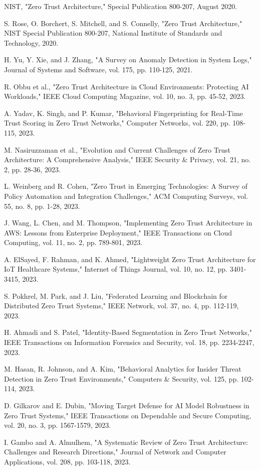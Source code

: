 \documentclass[conference]{IEEEtran}
\begin{document}
\begin{thebibliography}{20}
NIST, "Zero Trust Architecture," Special Publication 800-207, August 2020.

S. Rose, O. Borchert, S. Mitchell, and S. Connelly, "Zero Trust Architecture," NIST Special Publication 800-207, National Institute of Standards and Technology, 2020.

H. Yu, Y. Xie, and J. Zhang, "A Survey on Anomaly Detection in System Logs," Journal of Systems and Software, vol. 175, pp. 110-125, 2021.

R. Obbu et al., "Zero Trust Architecture in Cloud Environments: Protecting AI Workloads," IEEE Cloud Computing Magazine, vol. 10, no. 3, pp. 45-52, 2023.

A. Yadav, K. Singh, and P. Kumar, "Behavioral Fingerprinting for Real-Time Trust Scoring in Zero Trust Networks," Computer Networks, vol. 220, pp. 108-115, 2023.

M. Nasiruzzaman et al., "Evolution and Current Challenges of Zero Trust Architecture: A Comprehensive Analysis," IEEE Security \& Privacy, vol. 21, no. 2, pp. 28-36, 2023.

L. Weinberg and R. Cohen, "Zero Trust in Emerging Technologies: A Survey of Policy Automation and Integration Challenges," ACM Computing Surveys, vol. 55, no. 8, pp. 1-28, 2023.

J. Wang, L. Chen, and M. Thompson, "Implementing Zero Trust Architecture in AWS: Lessons from Enterprise Deployment," IEEE Transactions on Cloud Computing, vol. 11, no. 2, pp. 789-801, 2023.

A. ElSayed, F. Rahman, and K. Ahmed, "Lightweight Zero Trust Architecture for IoT Healthcare Systems," Internet of Things Journal, vol. 10, no. 12, pp. 3401-3415, 2023.

S. Pokhrel, M. Park, and J. Liu, "Federated Learning and Blockchain for Distributed Zero Trust Systems," IEEE Network, vol. 37, no. 4, pp. 112-119, 2023.

H. Ahmadi and S. Patel, "Identity-Based Segmentation in Zero Trust Networks," IEEE Transactions on Information Forensics and Security, vol. 18, pp. 2234-2247, 2023.

M. Hasan, R. Johnson, and A. Kim, "Behavioral Analytics for Insider Threat Detection in Zero Trust Environments," Computers \& Security, vol. 125, pp. 102-114, 2023.

D. Gilkarov and E. Dubin, "Moving Target Defense for AI Model Robustness in Zero Trust Systems," IEEE Transactions on Dependable and Secure Computing, vol. 20, no. 3, pp. 1567-1579, 2023.

I. Gambo and A. Almulhem, "A Systematic Review of Zero Trust Architecture: Challenges and Research Directions," Journal of Network and Computer Applications, vol. 208, pp. 103-118, 2023.

\end{thebibliography}
\end{document}

